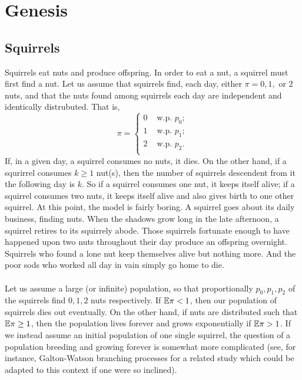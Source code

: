 \section{Genesis}
\subsection{Squirrels}
Squirrels eat nuts and produce offspring. In order to eat a nut,
a squirrel must first find a nut. Let us assume that
squirrels find, each day, either $\pi = 0, 1,$ or $2$ nuts, and
that the nuts found among squirrels each day are independent
and identically distrubuted. That is,
$$ \pi = 
\begin{cases}
    0 & \text{ w.p. } p_0; \\
    1 & \text{ w.p. } p_1; \\
    2 & \text{ w.p. } p_2. \\
\end{cases}
$$
If, in a given day, a squirrel consumes no nuts, it dies. On the other hand,
if a squrirrel consumes $k\ge 1$ nut(s), then the number of squirrels descendent
from it the following day is $k$. So if a squirrel consumes one nut, it keeps itself
alive; if a squirrel consumes two nuts, it keeps itself alive and also gives birth to
one other squirrel. At this point, the model is fairly boring. A squirrel 
goes about its daily business, finding nuts. When the shadows grow long
in the late afternoon, a squirrel retires to its squirrely abode. Those squirrels
fortunate enough to have happened upon two nuts throughout their day produce an offspring overnight.
Squirrels who found a lone nut keep themselves alive but nothing more. And the poor sods who worked all
day in vain simply go home to die. \\ \\
Let us assume a large (or infinite) population, so that proportionally $p_0, p_1, p_2$ of the squirrels find
$0,1,2$ nuts respectively. If $\mathbb{E}\pi < 1$, then our population of squirrels dies out eventually. On the other hand,
if nuts are distributed such that $\mathbb{E}\pi \ge 1$, then the population lives forever and grows exponentially if 
$\mathbb{E}\pi > 1$. If we instead assume an initial population of one single squirrel, the question of a population breeding
and growing forever is somewhat more complicated (see, for instance, Galton-Watson branching processes for
a related study which could be adapted to this context if one were so inclined). 

